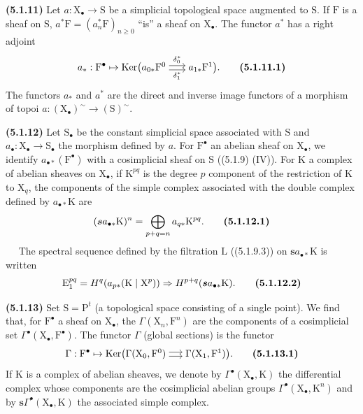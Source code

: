\documentclass[11pt,leqno]{article}
\newcommand{\Page}[1]{\ifvmode\noindent\else\unskip\ \fi{\footnotesize\textcolor{gray}{[p.\,#1]}}\ \ignorespaces}
\begin{document}
\textbf{(5.1.11)} Let \(a:\mathrm{X}_{\bullet}\to\mathrm{S}\) be a simplicial topological space augmented to \(\mathrm{S}\). If \(\mathrm{F}\) is a sheaf on \(\mathrm{S}\), \(a^*\mathrm{F}=(a_n^*\mathrm{F})_{n\geq0}\) “is” a sheaf on \(\mathrm{X}_{\bullet}\). The functor \(a^*\) has a right adjoint
\[
a_*:\mathrm{F}^{\bullet}\mapsto
\operatorname{Ker}\bigl(
\begin{tikzcd}[ampersand replacement=\&, cramped, column sep=1.7em, baseline=-0.5ex]
a_{0*}\mathrm{F}^0
  \arrow[r, shift left=0.5ex, "\delta_0^*"]
  \arrow[r, shift right=0.5ex, "\delta_1^*"']
\& a_{1*}\mathrm{F}^1
\end{tikzcd}
\bigr).
\tag*{\textbf{(5.1.11.1)}}
\]
The functors \(a_*\) and \(a^*\) are the direct and inverse image functors of a morphism of topoi \(a:(\mathrm{X}_{\bullet})^{\sim}\to(\mathrm{S})^{\sim}\).

\textbf{(5.1.12)} Let \(\mathrm{S}_{\bullet}\) be the constant simplicial space associated with \(\mathrm{S}\) and \(a_{\bullet}:\mathrm{X}_{\bullet}\to\mathrm{S}_{\bullet}\) the morphism defined by \(a\). For \(\mathrm{F}^{\bullet}\) an abelian sheaf on \(\mathrm{X}_{\bullet}\), we identify \(a_{\bullet *}(\mathrm{F}^{\bullet})\) with a cosimplicial sheaf on \(\mathrm{S}\) ((5.1.9) (IV)). For \(\mathrm{K}\) a complex of abelian sheaves on \(\mathrm{X}_{\bullet}\), if \(\mathrm{K}^{pq}\) is the degree \(p\) component of the restriction of \(\mathrm{K}\) to \(\mathrm{X}_q\), the components of the simple complex associated with the double complex defined by \(a_{\bullet *}\mathrm{K}\) are
\[
(\boldsymbol{s}a_{\bullet *}\mathrm{K})^n
=\bigoplus_{p+q=n}a_{q*}\mathrm{K}^{pq}.
\tag*{\textbf{(5.1.12.1)}}
\]
\Page{12}
The spectral sequence defined by the filtration \(\mathrm{L}\) ((5.1.9.3)) on \(\boldsymbol{s}a_{\bullet *}\mathrm{K}\) is written
\[
\mathrm{E}_1^{pq}
=H^q(a_{p*}(\mathrm{K}\mid\mathrm{X}^{p}))
\Rightarrow H^{p+q}(\boldsymbol{s}a_{\bullet *}\mathrm{K}).
\tag*{\textbf{(5.1.12.2)}}
\]

\textbf{(5.1.13)} Set \(\mathrm{S}=\mathrm{P}^{t}\) (a topological space consisting of a single point). We find that, for \(\mathrm{F}^{\bullet}\) a sheaf on \(\mathrm{X}_{\bullet}\), the \(\Gamma(\mathrm{X}_n,\mathrm{F}^n)\) are the components of a cosimplicial set \(\Gamma^{\bullet}(\mathrm{X}_{\bullet},\mathrm{F}^{\bullet})\). The functor \(\Gamma\) (global sections) is the functor
\[
\Gamma:\mathrm{F}^{\bullet}\mapsto
\operatorname{Ker}\bigl(
\begin{tikzcd}[ampersand replacement=\&, cramped, column sep=1.4em, baseline=-0.5ex]
\Gamma(\mathrm{X}_0,\mathrm{F}^0)
  \arrow[r, shift left=0.5ex]
  \arrow[r, shift right=0.5ex]
\& \Gamma(\mathrm{X}_1,\mathrm{F}^1)
\end{tikzcd}
\bigr).
\tag*{\textbf{(5.1.13.1)}}
\]
If \(\mathrm{K}\) is a complex of abelian sheaves, we denote by \(\Gamma^{\bullet}(\mathrm{X}_{\bullet},\mathrm{K})\) the differential complex whose components are the cosimplicial abelian groups \(\Gamma^{\bullet}(\mathrm{X}_{\bullet},\mathrm{K}^n)\) and by \(\boldsymbol{s}\Gamma^{\bullet}(\mathrm{X}_{\bullet},\mathrm{K})\) the associated simple complex.
\end{document}
